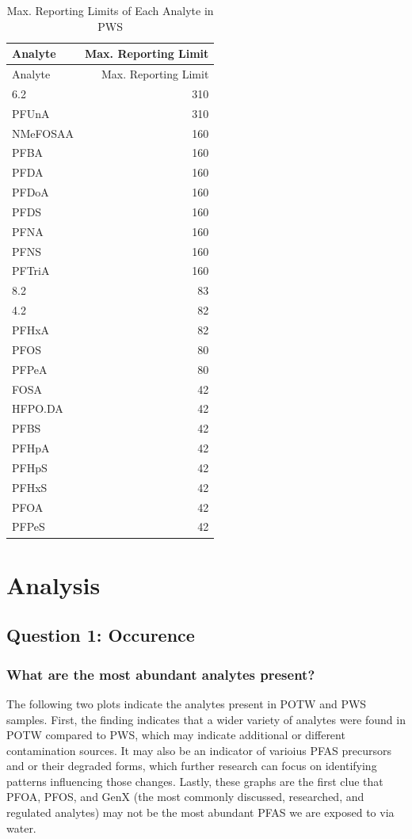 \documentclass[
  12pt,
]{article}
\begin{document}
\begin{longtable}[]{@{}lr@{}}
\caption{Max. Reporting Limits of Each Analyte in PWS}\tabularnewline
\toprule
Analyte & Max. Reporting Limit\tabularnewline
\midrule
\endfirsthead
\toprule
Analyte & Max. Reporting Limit\tabularnewline
\midrule
\endhead
6.2 & 310\tabularnewline
PFUnA & 310\tabularnewline
NMeFOSAA & 160\tabularnewline
PFBA & 160\tabularnewline
PFDA & 160\tabularnewline
PFDoA & 160\tabularnewline
PFDS & 160\tabularnewline
PFNA & 160\tabularnewline
PFNS & 160\tabularnewline
PFTriA & 160\tabularnewline
8.2 & 83\tabularnewline
4.2 & 82\tabularnewline
PFHxA & 82\tabularnewline
PFOS & 80\tabularnewline
PFPeA & 80\tabularnewline
FOSA & 42\tabularnewline
HFPO.DA & 42\tabularnewline
PFBS & 42\tabularnewline
PFHpA & 42\tabularnewline
PFHpS & 42\tabularnewline
PFHxS & 42\tabularnewline
PFOA & 42\tabularnewline
PFPeS & 42\tabularnewline
\bottomrule
\end{longtable}

\newpage

\hypertarget{analysis}{%
\section{Analysis}\label{analysis}}

\hypertarget{question-1-occurence}{%
\subsection{Question 1: Occurence}\label{question-1-occurence}}

\hypertarget{what-are-the-most-abundant-analytes-present}{%
\subsubsection{What are the most abundant analytes
present?}\label{what-are-the-most-abundant-analytes-present}}

The following two plots indicate the analytes present in POTW and PWS
samples. First, the finding indicates that a wider variety of analytes
were found in POTW compared to PWS, which may indicate additional or
different contamination sources. It may also be an indicator of varioius
PFAS precursors and or their degraded forms, which further research can
focus on identifying patterns influencing those changes. Lastly, these
graphs are the first clue that PFOA, PFOS, and GenX (the most commonly
discussed, researched, and regulated analytes) may not be the most
abundant PFAS we are exposed to via water.
\end{document}
